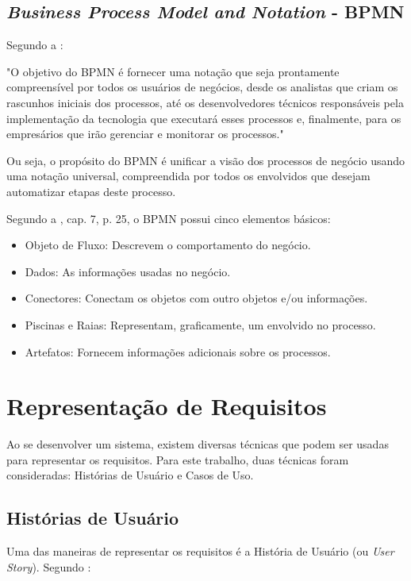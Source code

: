 \subsection{\textit{Business Process Model and Notation} - BPMN}
Segundo a \citeauthor{bpmn2013}: 

\begin{citacaoLonga}
"O objetivo do BPMN é fornecer uma notação que seja prontamente compreensível por todos os usuários de negócios, desde os analistas que criam os rascunhos iniciais dos processos, até os desenvolvedores técnicos responsáveis pela implementação da tecnologia que executará esses processos e, finalmente, para os empresários que irão gerenciar e monitorar os processos."
\end{citacaoLonga}

Ou seja, o propósito do BPMN é unificar a visão dos processos de negócio usando uma notação universal, compreendida por todos os envolvidos que desejam automatizar etapas deste processo.

Segundo a \citeauthor{bpmn2013}, cap. 7, p. 25, o BPMN possui cinco elementos básicos:

\begin{itemize}
    \item Objeto de Fluxo: Descrevem o comportamento do negócio.
    \item Dados: As informações usadas no negócio.
    \item Conectores: Conectam os objetos com outro objetos e/ou informações.
    \item Piscinas e Raias: Representam, graficamente, um envolvido no processo.
    \item Artefatos: Fornecem informações adicionais sobre os processos.
\end{itemize}

\section{Representação de Requisitos}
Ao se desenvolver um sistema, existem diversas técnicas que podem ser usadas para representar os requisitos. Para este trabalho, duas técnicas foram consideradas: Histórias de Usuário e Casos de Uso.

\subsection{Histórias de Usuário}
Uma das maneiras de representar os requisitos é a História de Usuário (ou \textit{User Story}). Segundo \citeauthor{jonathanrasmusson}:

